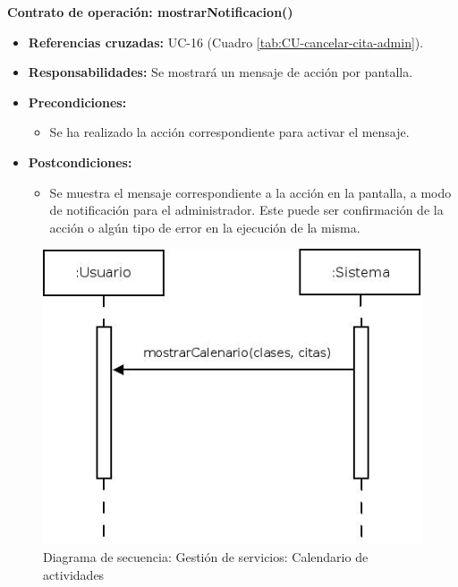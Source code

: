 \textbf{Contrato de operación: mostrarNotificacion()}
\begin{itemize}
\item \textbf{Referencias cruzadas:} UC-16 (Cuadro \ref{tab:CU-cancelar-cita-admin}).
\item \textbf{Responsabilidades:} Se mostrará un mensaje de acción por pantalla.
\item \textbf{Precondiciones:} 
 \begin{itemize}
\item Se ha realizado la acción correspondiente para activar el mensaje.
\end {itemize}
\item \textbf{Postcondiciones:} 
 \begin{itemize}
\item Se muestra el mensaje correspondiente a la acción en la pantalla, a modo de notificación para el administrador. Este puede ser confirmación de la acción o algún tipo de error en la ejecución de la misma.
\end {itemize}
\end {itemize}


\vspace{10mm}

\begin{figure}[H]
\centering
  \includegraphics[scale=.55]{img/secuencias/gestion-servicios-calendario.jpeg}
  \caption{Diagrama de secuencia: Gestión de servicios: Calendario de actividades}
  \label{fig:secuencia-gestion-servicios-calendario}
\end{figure}

